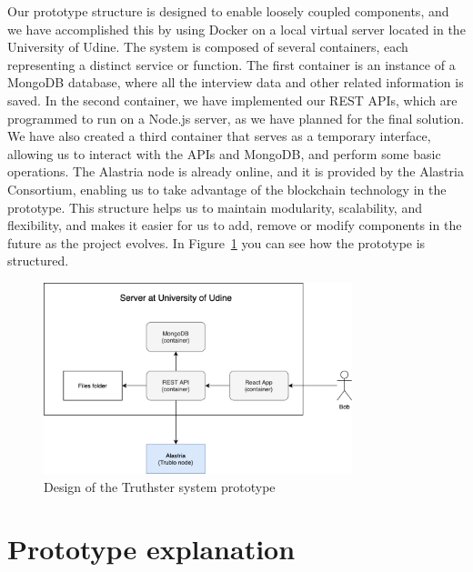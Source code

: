\documentclass[target=mst,aauheader=]{thud}
\begin{document}
Our prototype structure is designed to enable loosely coupled components, and we have accomplished this by using Docker\cite{docker} on a local virtual server located in the University of Udine. The system is composed of several containers, each representing a distinct service or function. The first container is an instance of a MongoDB database, where all the interview data and other related information is saved. In the second container, we have implemented our REST APIs, which are programmed to run on a Node.js server, as we have planned for the final solution. We have also created a third container that serves as a temporary interface, allowing us to interact with the APIs and MongoDB, and perform some basic operations. The Alastria node is already online, and it is provided by the Alastria Consortium, enabling us to take advantage of the blockchain technology in the prototype. This structure helps us to maintain modularity, scalability, and flexibility, and makes it easier for us to add, remove or modify components in the future as the project evolves. In Figure~\ref{fig:prototypeSchema} you can see how the prototype is structured.

\begin{figure}
    \centering
    \includegraphics[width=0.8\textwidth]{images/prototypeSchema.png}
    \caption{Design of the Truthster system prototype}
    \label{fig:prototypeSchema}
\end{figure}

\section{Prototype explanation}
\end{document}
